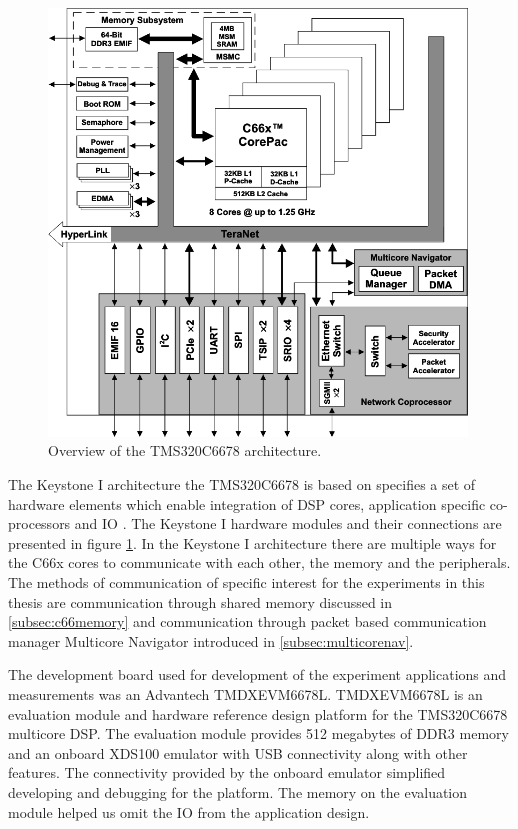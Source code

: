 \begin{figure}[h!]
    \begin{center}
        \includegraphics[width=0.99\textwidth]{images/fbd_SPRS691e.png}
        \caption{Overview of the TMS320C6678 architecture. }
        \label{fig:arch_overview}
    \end{center}
\end{figure}

 The Keystone I architecture the TMS320C6678 is based on specifies a set of hardware elements which enable integration of DSP cores, application specific co-processors and IO \cite{tmsdatasheet}. The Keystone I hardware modules and their connections are presented in figure \ref{fig:arch_overview}. In the Keystone I architecture there are multiple ways for the C66x cores to communicate with each other, the memory and the peripherals. The methods of communication of specific interest for the experiments in this thesis are communication through shared memory discussed in \ref{subsec:c66memory} and communication through packet based communication manager Multicore Navigator introduced in \ref{subsec:multicorenav}.

The development board used for development of the experiment applications and measurements was an Advantech TMDXEVM6678L. TMDXEVM6678L is an evaluation module and hardware reference design platform for the TMS320C6678 multicore DSP. The evaluation module provides 512 megabytes of DDR3 memory and an onboard XDS100 emulator with USB connectivity along with other features. \cite{evmref} The connectivity provided by the onboard emulator simplified developing and debugging for the platform. The memory on the evaluation module helped us omit the IO from the application design.

